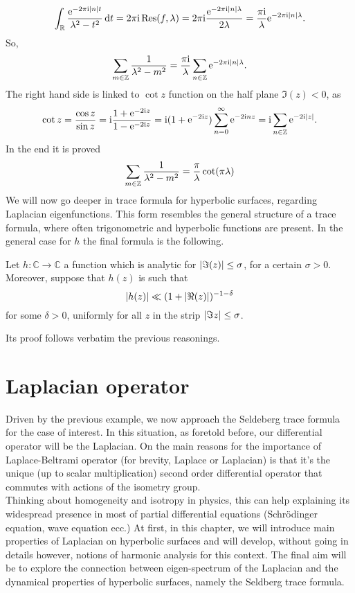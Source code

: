 \[
\int_{\mathbb{R}}\frac{\mathrm{e}^{-2\pi\mathrm{i}\left| n\right|t}}{\lambda^{2}-t^{2}}\mathop{}\!\mathrm{d} t=2\pi\mathrm{i}\operatorname{Res}(f,\lambda)=2\pi\mathrm{i}\frac{\mathrm{e}^{-2\pi\mathrm{i}\left| n\right|\lambda}}{2\lambda}=\frac{\pi\mathrm{i}}{\lambda}\mathrm{e}^{-2\pi\mathrm{i}\left| n\right|\lambda}.
\]
So,
\[
\sum_{m\in\mathbb{Z}}\frac{1}{\lambda^{2}-m^{2}}=\frac{\pi\mathrm{i}}{\lambda}\sum_{n\in\mathbb{Z}}\mathrm{e}^{-2\pi\mathrm{i}\left| n\right|\lambda}.
\]
The right hand side is linked to $\cot z$ function on the half plane $\Im(z)<0$, as
\[
\cot z=\frac{\cos z}{\sin z}=\mathrm{i}\frac{1+\mathrm{e}^{-2\mathrm{i} z}}{1-\mathrm{e}^{-2\mathrm{i} z}}=\mathrm{i}(1+\mathrm{e}^{-2\mathrm{i} z})\sum_{n=0}^{\infty}\mathrm{e}^{-2\mathrm{i} n z}=\mathrm{i}\sum_{n\in\mathbb{Z}}\mathrm{e}^{-2\mathrm{i}\left| z\right|}.
\]
In the end it is proved 
\[
\sum_{m\in\mathbb{Z}}\frac{1}{\lambda^{2}-m^{2}}=\frac{\pi}{\lambda}\cot(\pi\lambda)
\]
We will now go deeper in trace formula for hyperbolic surfaces, regarding Laplacian eigenfunctions. This form resembles the general structure of a trace formula, where often trigonometric and hyperbolic functions are present. In the general case for $h$ the final formula is the following. 

\begin{nteo}
Let $h\colon\mathbb{C}\to\mathbb{C}$ a function which is analytic for $\left| \Im(z)\right|\leq \sigma$, for a certain $\sigma>0$. Moreover, suppose that $h(z)$ is such that
\[
\left| h(z)\right|\ll(1+\left| \Re(z)\right|)^{-1-\delta}
\]
for some $\delta>0$, uniformly for all $z$ in the strip $\left| \Im z\right|\leq \sigma$.
\end{nteo}

Its proof follows verbatim the previous reasonings. 


\section{Laplacian operator}

Driven by the previous example, we now approach the Seldeberg trace formula for the case of interest. In this situation, as foretold before, our differential operator will be the Laplacian. On the main reasons for the importance of Laplace-Beltrami operator (for brevity, Laplace or Laplacian) is that it's the unique (up to scalar multiplication) second order differential operator that commutes with actions of the isometry group.\\
Thinking about homogeneity and isotropy in physics, this can help explaining its widespread presence in most of partial differential equations (Schr{\"o}dinger equation, wave equation ecc.)
At first, in this chapter, we will introduce main properties of Laplacian on hyperbolic surfaces and will develop, without going in details however, notions of harmonic analysis for this context. The final aim will be to explore the connection between eigen-spectrum of the Laplacian and the dynamical properties of hyperbolic surfaces, namely the Seldberg trace formula.

